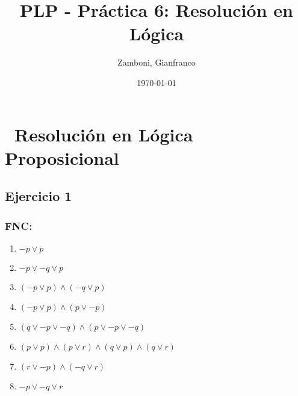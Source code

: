 \documentclass[10pt,a4paper]{article}
\begin{document}
  \title{PLP - Práctica 6: Resolución en Lógica}

  \date{\today}

  \author{Zamboni, Gianfranco}

  \maketitle
  \setcounter{page}{1}

  \section*{\ Resolución en Lógica Proposicional}
  \subsection{Ejercicio 1}
    \subsubsection{FNC:}
    \begin{enumerate}
    \item $-p \vee p$
    \item $-p \vee -q \vee p$
    \item $(-p \vee p) \wedge (-q \vee p)$
    \item $(-p \vee p) \wedge (p \vee -p)$
    \item $(q \vee -p \vee -q) \wedge (p \vee -p \vee -q)$
    \item $(p \vee p) \wedge (p \vee r) \wedge (q \vee p) \wedge (q \vee r)$
    \item $(r \vee -p) \wedge (-q \vee r)$
    \item $-p \vee -q \vee r$
    \end{enumerate}
    \subsubsection{}
\end{document}
